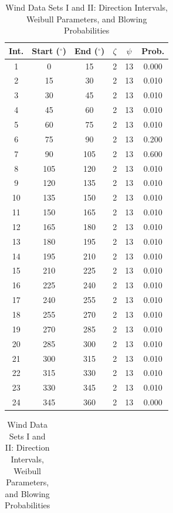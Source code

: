 \documentclass[journal,twoside]{IEEEtran}
\begin{document}
\begin{table}[htbp]
\centering
\caption{Wind Data Sets I and II: Direction Intervals, Weibull Parameters, and Blowing Probabilities}
\begin{minipage}{0.49\textwidth}
\centering
\begin{tabular}{cccccc}
\toprule
\textbf{Int.} & \textbf{Start ($^\circ$)} & \textbf{End ($^\circ$)} & \textbf{$\zeta$}  & \textbf{$\psi$} & \textbf{Prob.} \\
\midrule
1  & 0   & 15  & 2 & 13   & 0.000 \\
2  & 15  & 30  & 2 & 13   & 0.010 \\
3  & 30  & 45  & 2 & 13   & 0.010 \\
4  & 45  & 60  & 2 & 13   & 0.010 \\
5  & 60  & 75  & 2 & 13   & 0.010 \\
6  & 75  & 90  & 2 & 13   & 0.200 \\
7  & 90  & 105 & 2 & 13   & 0.600 \\
8  & 105 & 120 & 2 & 13   & 0.010 \\
9  & 120 & 135 & 2 & 13   & 0.010 \\
10 & 135 & 150 & 2 & 13   & 0.010 \\
11 & 150 & 165 & 2 & 13   & 0.010 \\
12 & 165 & 180 & 2 & 13   & 0.010 \\
13 & 180 & 195 & 2 & 13   & 0.010 \\
14 & 195 & 210 & 2 & 13   & 0.010 \\
15 & 210 & 225 & 2 & 13   & 0.010 \\
16 & 225 & 240 & 2 & 13   & 0.010 \\
17 & 240 & 255 & 2 & 13   & 0.010 \\
18 & 255 & 270 & 2 & 13   & 0.010 \\
19 & 270 & 285 & 2 & 13   & 0.010 \\
20 & 285 & 300 & 2 & 13   & 0.010 \\
21 & 300 & 315 & 2 & 13   & 0.010 \\
22 & 315 & 330 & 2 & 13   & 0.010 \\
23 & 330 & 345 & 2 & 13   & 0.010 \\
24 & 345 & 360 & 2 & 13   & 0.000 \\
\bottomrule
\end{tabular}
\label{tab:wind_data_I}
\end{minipage}
\hfill
\begin{minipage}{0.49\textwidth}
\centering
\begin{tabular}{cccccc}

\end{tabular}
\end{minipage}
\end{table}
\end{document}
